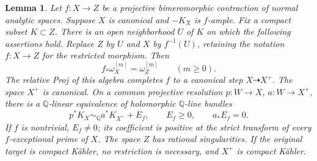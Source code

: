 \documentclass[11pt,a4paper]{article}
\numberwithin{equation}{section}
\newtheorem{lemma}[theorem]{Lemma}
\theoremstyle{definition}
\theoremstyle{remark}
\newcommand{\Q}{\mathbb Q}\newcommand{\R}{\mathbb R}
\begin{document}
\begin{lemma}\label{lem:canonical-replacement}
Let $f:X\to Z$ be a projective bimeromorphic contraction of normal
analytic spaces. Suppose $X$ is canonical and $-K_X$ is $f$-ample.
Fix a compact subset $K\subset Z$. There is an open neighborhood
$U$ of $K$ on which the following assertions hold. Replace $Z$ by $U$
and $X$ by $f^{-1}(U)$, retaining the notation $f:X\to Z$ for the
restricted morphism. Then
\begin{equation}\label{eq:negative-canonical-algebra}
 f_*\omega_X^{[m]}=\omega_Z^{[m]}\qquad(m\ge0).
\end{equation}
The relative Proj of this algebra completes $f$ to a canonical step
$X\dashrightarrow X^+$. The space $X^+$
is canonical. On a common projective resolution $p:W\to X$,
$a:W\to X^+$, there is a $\Q$-linear equivalence of holomorphic
$\Q$-line bundles
\begin{equation}\label{eq:mixed-canonical-comparison}
 p^*K_X\sim_{\Q}a^*K_{X^+}+E_f,
 \qquad E_f\ge0,\qquad a_*E_f=0.
\end{equation}
If $f$ is nontrivial, $E_f\ne0$; its coefficient is positive at the
strict transform of every $f$-exceptional prime of $X$.
The space $Z$ has rational singularities. If the original target is
compact Kähler, no restriction is necessary, and $X^+$ is compact Kähler.
\end{lemma}
\end{document}
